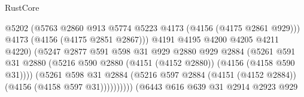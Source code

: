\begin{lexlean}{RustCore}
\begin{coremodule}
                                              @5202
                                              (@5763
                                                @2860
                                                @913
                                                @5774
                                                @5223
                                                @4173
                                                (@4156 (@4175 @2861 @929)))
                                              @4173
                                              (@4156 (@4175 @2851 @2867)))
                                            @4191
                                            @4195
                                            @4200
                                            @4205
                                            @4211
                                            @4220)
                                          (@5247
                                            @2877
                                            @591
                                            @598
                                            @31
                                            @929
                                            @2880
                                            @929
                                            @2884
                                            (@5261
                                              @591
                                              @31
                                              @2880
                                              (@5216
                                                @590
                                                @2880
                                                (@4151 (@4152 @2880))
                                                (@4156 (@4158 @590 @31))))
                                            (@5261
                                              @598
                                              @31
                                              @2884
                                              (@5216
                                                @597
                                                @2884
                                                (@4151 (@4152 @2884))
                                                (@4156 (@4158 @597 @31))))))))))
                                (@6443
                                  @616
                                  @639
                                  @31
                                  @2914
                                  @2923
                                  @929

\end{coremodule}
\end{lexlean}

